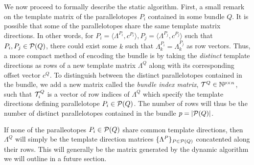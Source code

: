We now proceed to formally describe the static algorithm.
%
First, a small remark on the template matrix of the parallelotopes $P_i$ contained in some bundle $Q$. It is possible that some of the parallelotopes share the same template matrix directions.
%
 In other words, for $P_i = \langle \Lambda^{P_i}, c^{P_i} \rangle, P_j = \langle \Lambda^{P_j}, c^{P_j} \rangle$ such that $P_i, P_j \in \mathcal{P}(Q)$, there could exist some $k$ such that $\Lambda^{P_i}_k = \Lambda^{P_j}_k$ as row vectors.
%
Thus, a more compact method of encoding the bundle is by taking the \emph{distinct} template directions as rows of a new template matrix $\Lambda^Q$ along with its corresponding offset vector $c^Q$.
%
To distinguish between the distinct parallelotopes contained in the bundle, we add a new matrix called the \emph{bundle index matrix}, $\mathcal{T}^Q \in \mathbb{N}^{p \times n}$, such that $\mathcal{T}^Q_i$ is a vector of row indices of $\Lambda^Q$ which specify the template directions defining parallelotope $P_i \in \mathcal{P}(Q)$.
%
The number of rows will thus be the number of distinct parallelotopes contained in the bundle $p = |\mathcal{P}(Q)|$.
%
\begin{remark}
If none of the paralleotopes $P_i \in \mathcal{P}(Q)$ share common template directions, then $\Lambda^Q$ will simply be the template direction matrices $\{\Lambda^P\}_{P \in \mathcal{P}(Q)}$ concatented along their rows. This will generally be the matrix generated by the dynamic algorithm we will outline in a future section.
\end{remark}
%
